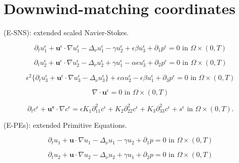 \documentclass[11pt]{article}
\begin{document}
\section{Downwind-matching coordinates}

(E-SNS): extended scaled Navier-Stokes.

    \begin{equation} \label{ANSC1}
    \partial_t u^\epsilon _1 + \mathbf{u}^\epsilon \cdot \nabla u^\epsilon _1 -\Delta_\nu u^\epsilon _1 -\gamma u_2^\epsilon + \epsilon \beta u_3^\epsilon + \partial_1 p^\epsilon = 0 \text{ in } \Omega \times (0,T)
    \end{equation}
    
    \begin{equation} \label{ANSC2}
    \partial_t u_2^\epsilon + \mathbf{u}^\epsilon \cdot \nabla u_2^\epsilon -\Delta_\nu u_2^\epsilon + \gamma u_1^\epsilon  - \alpha \epsilon u^\epsilon_3 + \partial_2 p^\epsilon = 0 \text{ in } \Omega \times (0,T)
    \end{equation}
    
    \begin{equation} \label{ANSC3}
    \epsilon^2 \{  \partial_t u_3^\epsilon + \mathbf{u}^\epsilon \cdot \nabla u_3^\epsilon -\Delta_\nu u_3^{\epsilon} \} + \epsilon \alpha u^\epsilon_2 - \epsilon \beta u_1^\epsilon + \partial_3 p^\epsilon = 0 \text{ in } \Omega \times (0,T)
    \end{equation}
    
    \begin{equation} \label{ANSC4}
    \nabla \cdot \mathbf{u}^\epsilon= 0 \text{ in } \Omega \times (0,T)
    \end{equation}
    
    \begin{equation} \label{ANSC5}
    \partial_t c^\epsilon + \mathbf{u^\epsilon} \cdot \nabla c^\epsilon = \epsilon K_1 \partial_{11} ^ 2 c^\epsilon + K_2 \partial_{22} ^ 2 c^\epsilon + K_3 \partial_{33} ^ 2 c^\epsilon + s^\epsilon \text{ in } \Omega \times (0,T).
    \end{equation}
    

(E-PEs): extended Primitive Equations.

    \begin{equation} \label{HNSC1}    
    \partial_t u_1 + \mathbf{u} \cdot \nabla u_1 - \Delta_\nu u_1 - \gamma u_2 + \partial_1 p = 0 \text{ in } \Omega \times (0,T)
    \end{equation}
    
    \begin{equation} \label{HNSC2}   
    \partial_t u_2 + \mathbf{u} \cdot \nabla u_2 - \Delta_\nu u_2 + \gamma u_1 + \partial_2 p = 0 \text{ in } \Omega \times (0,T)
    \end{equation}
    
\end{document}
